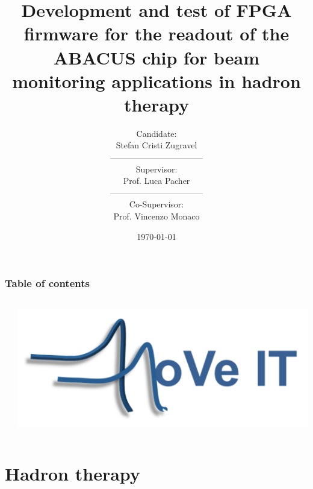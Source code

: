 \documentclass[aspectratio=169]{beamer}
\title{Development and test of FPGA firmware for the readout of the ABACUS chip for beam monitoring applications in hadron therapy}
\author[Stefan Zugravel]{Candidate: \\ Stefan Cristi Zugravel \\ --------------------------------- \\ Supervisor: \\ Prof. Luca Pacher\\ ---------------------------------  \\ Co-Supervisor: \\ Prof. Vincenzo Monaco}
\date{\today}
\institute[UniTo]{University of Turin}
\begin{document}
	
	\begin{frame}		
		\maketitle
	\end{frame}

	\begin{frame}
	\frametitle{Table of contents}
		\begin{columns}
				\begin{center}
					\tableofcontents
				\end{center}
				\begin{center}
					\includegraphics[width=0.95 \textwidth]{IMG/Move_IT_logo.PNG}
				\end{center}
		\end{columns}	
	\end{frame}

	\section{Hadron therapy}
	
\end{document}
